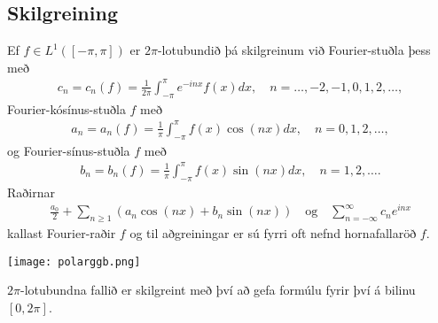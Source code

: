 \documentclass[a4paper,10pt,icelandic]{sphinxmanual}
\begin{document}
\subsection{Skilgreining}
\label{\detokenize{Kafli02:id3}}
Ef \(f \in L^1([-\pi,\pi])\) er \(2\pi\)-lotubundið þá skilgreinum við Fourier-stuðla þess með
\begin{equation*}
\begin{split}c_n = c_n(f) = \frac{1}{2\pi} \int_{-\pi}^\pi e^{-inx} f(x) dx, \quad n = \ldots,-2,-1,0,1,2,\ldots,\end{split}
\end{equation*}
Fourier-kósínus-stuðla \(f\) með
\begin{equation*}
\begin{split}a_n = a_n(f) = \frac{1}{\pi} \int_{-\pi}^\pi f(x) \cos(nx) dx, \quad n = 0,1,2,\ldots,\end{split}
\end{equation*}
og Fourier-sínus-stuðla \(f\) með
\begin{equation*}
\begin{split}b_n = b_n(f) = \frac{1}{\pi} \int_{-\pi}^\pi f(x) \sin(nx) dx, \quad n = 1,2,\ldots.\end{split}
\end{equation*}
Raðirnar
\begin{equation*}
\begin{split}\frac{a_0}{2} + \sum_{n\geq 1} \left(a_n \cos(nx) + b_n \sin(nx)\right) \quad \text{og} \quad \sum_{n=-\infty}^\infty c_n e^{inx}\end{split}
\end{equation*}
kallast Fourier-raðir \(f\) og til aðgreiningar er sú fyrri oft nefnd hornafallaröð \(f\).

\begin{DUlineblock}{0em}
\item[] 
\item[] 
\end{DUlineblock}


\begin{center}
\texttt{[image: polarggb.png]}
\end{center}


\(2\pi\)-lotubundna fallið er skilgreint með því að gefa formúlu fyrir því á bilinu \([0,2\pi]\).

\begin{DUlineblock}{0em}
\item[] 
\item[] 
\end{DUlineblock}
\end{document}
